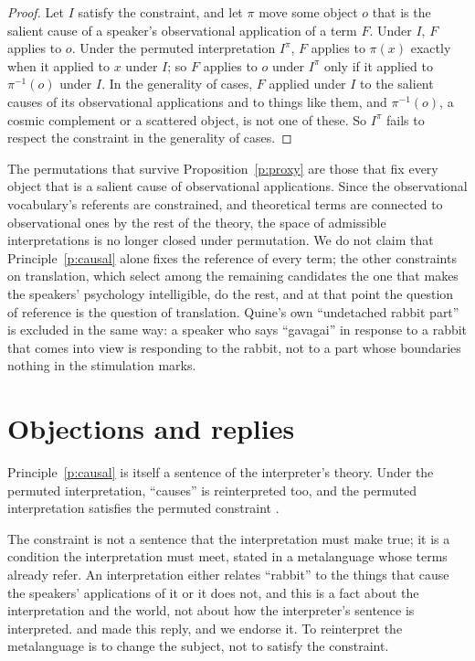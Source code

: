 \documentclass{situationist-preprint}
\begin{document}
\begin{proof}
Let $I$ satisfy the constraint, and let $\pi$ move some object $o$ that is the salient cause of a speaker's observational application of a term $F$. Under $I$, $F$ applies to $o$. Under the permuted interpretation $I^\pi$, $F$ applies to $\pi(x)$ exactly when it applied to $x$ under $I$; so $F$ applies to $o$ under $I^\pi$ only if it applied to $\pi^{-1}(o)$ under $I$. In the generality of cases, $F$ applied under $I$ to the salient causes of its observational applications and to things like them, and $\pi^{-1}(o)$, a cosmic complement or a scattered object, is not one of these. So $I^\pi$ fails to respect the constraint in the generality of cases.
\end{proof}

The permutations that survive Proposition~\ref{p:proxy} are those that fix every object that is a salient cause of observational applications. Since the observational vocabulary's referents are constrained, and theoretical terms are connected to observational ones by the rest of the theory, the space of admissible interpretations is no longer closed under permutation. We do not claim that Principle~\ref{p:causal} alone fixes the reference of every term; the other constraints on translation, which select among the remaining candidates the one that makes the speakers' psychology intelligible, do the rest, and at that point the question of reference is the question of translation. Quine's own \enquote{undetached rabbit part} is excluded in the same way: a speaker who says \enquote{gavagai} in response to a rabbit that comes into view is responding to the rabbit, not to a part whose boundaries nothing in the stimulation marks.

\section{Objections and replies}

\begin{objection}
Principle~\ref{p:causal} is itself a sentence of the interpreter's theory. Under the permuted interpretation, \enquote{causes} is reinterpreted too, and the permuted interpretation satisfies the permuted constraint \citep{Putnam1981}.
\end{objection}

\begin{reply}
The constraint is not a sentence that the interpretation must make true; it is a condition the interpretation must meet, stated in a metalanguage whose terms already refer. An interpretation either relates \enquote{rabbit} to the things that cause the speakers' applications of it or it does not, and this is a fact about the interpretation and the world, not about how the interpreter's sentence is interpreted. \citet{Lewis1984} and \citet{Devitt1983} made this reply, and we endorse it. To reinterpret the metalanguage is to change the subject, not to satisfy the constraint.
\end{reply}
\end{document}
